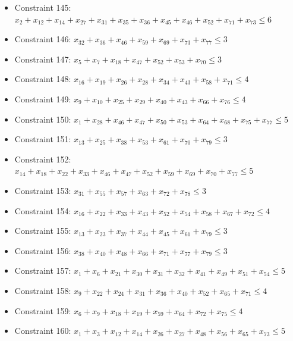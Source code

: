 \documentclass[11pt]{article}
\begin{document}
\begin{itemize}
\item Constraint 145: $x_{2} + x_{12} + x_{14} + x_{27} + x_{31} + x_{35} + x_{36} + x_{45} + x_{46} + x_{52} + x_{71} + x_{73} \le 6$
\item Constraint 146: $x_{32} + x_{36} + x_{46} + x_{59} + x_{69} + x_{73} + x_{77} \le 3$
\item Constraint 147: $x_{5} + x_{7} + x_{18} + x_{47} + x_{52} + x_{53} + x_{70} \le 3$
\item Constraint 148: $x_{16} + x_{19} + x_{26} + x_{28} + x_{34} + x_{43} + x_{58} + x_{71} \le 4$
\item Constraint 149: $x_{9} + x_{10} + x_{25} + x_{29} + x_{40} + x_{43} + x_{66} + x_{76} \le 4$
\item Constraint 150: $x_{1} + x_{28} + x_{46} + x_{47} + x_{50} + x_{53} + x_{64} + x_{68} + x_{75} + x_{77} \le 5$
\item Constraint 151: $x_{13} + x_{25} + x_{38} + x_{53} + x_{61} + x_{70} + x_{79} \le 3$
\item Constraint 152: $x_{14} + x_{18} + x_{22} + x_{33} + x_{46} + x_{47} + x_{52} + x_{59} + x_{69} + x_{70} + x_{77} \le 5$
\item Constraint 153: $x_{31} + x_{55} + x_{57} + x_{63} + x_{72} + x_{78} \le 3$
\item Constraint 154: $x_{16} + x_{22} + x_{33} + x_{43} + x_{52} + x_{54} + x_{58} + x_{67} + x_{72} \le 4$
\item Constraint 155: $x_{13} + x_{23} + x_{37} + x_{44} + x_{45} + x_{61} + x_{79} \le 3$
\item Constraint 156: $x_{38} + x_{40} + x_{48} + x_{66} + x_{71} + x_{77} + x_{79} \le 3$
\item Constraint 157: $x_{1} + x_{6} + x_{21} + x_{30} + x_{31} + x_{32} + x_{41} + x_{49} + x_{51} + x_{54} \le 5$
\item Constraint 158: $x_{9} + x_{22} + x_{24} + x_{31} + x_{36} + x_{40} + x_{52} + x_{65} + x_{71} \le 4$
\item Constraint 159: $x_{6} + x_{9} + x_{18} + x_{19} + x_{59} + x_{64} + x_{72} + x_{75} \le 4$
\item Constraint 160: $x_{1} + x_{3} + x_{12} + x_{14} + x_{26} + x_{27} + x_{48} + x_{56} + x_{65} + x_{73} \le 5$
\end{itemize}
\end{document}
